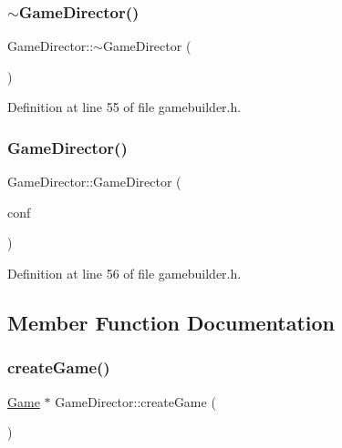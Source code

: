 \subsubsection{\texorpdfstring{$\sim$\+Game\+Director()}{~GameDirector()}}
{\footnotesize\ttfamily Game\+Director\+::$\sim$\+Game\+Director (\begin{DoxyParamCaption}{ }\end{DoxyParamCaption})\hspace{0.3cm}{\ttfamily [inline]}}



Definition at line 55 of file gamebuilder.\+h.

\mbox{\label{class_game_director_a3ac974d917a3cff7a7873bcf9bbfc2ce}} 
\subsubsection{\texorpdfstring{Game\+Director()}{GameDirector()}}
{\footnotesize\ttfamily Game\+Director\+::\+Game\+Director (\begin{DoxyParamCaption}\item[{Q\+Json\+Object $\ast$}]{conf }\end{DoxyParamCaption})\hspace{0.3cm}{\ttfamily [inline]}}



Definition at line 56 of file gamebuilder.\+h.



\subsection{Member Function Documentation}
\mbox{\label{class_game_director_a39ad3747cf1b3bf8a6e335167f73d04b}} 
\subsubsection{\texorpdfstring{create\+Game()}{createGame()}}
{\footnotesize\ttfamily \mbox{\hyperlink{class_game}{Game}} $\ast$ Game\+Director\+::create\+Game (\begin{DoxyParamCaption}{ }\end{DoxyParamCaption})}



